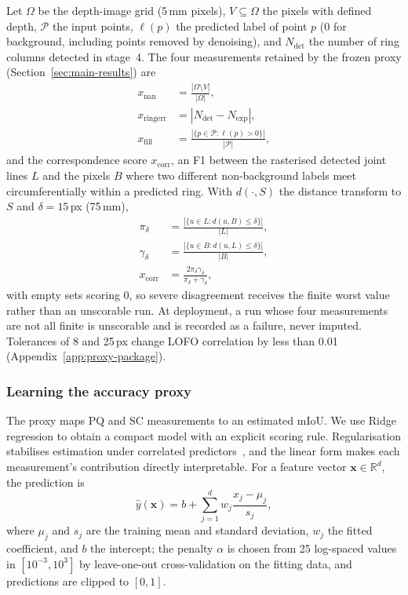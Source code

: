 \documentclass[a4paper,fleqn]{cas-dc}
\begin{document}
Let $\Omega$ be the depth-image grid (5\,mm pixels), $V\subseteq\Omega$ the pixels with defined depth, $\mathcal P$ the input points, $\ell(p)$ the predicted label of point $p$ (0 for background, including points removed by denoising), and $N_{\mathrm{det}}$ the number of ring columns detected in stage~4. The four measurements retained by the frozen proxy (Section~\ref{sec:main-results}) are
\begin{equation}
\begin{aligned}
x_{\mathrm{nan}}&=\frac{|\Omega\setminus V|}{|\Omega|},\\
x_{\mathrm{ringerr}}&=|N_{\mathrm{det}}-N_{\mathrm{exp}}|,\\
x_{\mathrm{fill}}&=\frac{|\{p\in\mathcal P:\ell(p)>0\}|}{|\mathcal P|},
\end{aligned}
\label{eq:feature-defs}
\end{equation}
and the correspondence score $x_{\mathrm{corr}}$, an F1 between the rasterised detected joint lines $L$ and the pixels $B$ where two different non-background labels meet circumferentially within a predicted ring. With $d(\cdot,S)$ the distance transform to $S$ and $\delta=15$\,px (75\,mm),
\begin{equation}
\begin{aligned}
\pi_\delta&=\frac{|\{u\in L: d(u,B)\le\delta\}|}{|L|},\\
\gamma_\delta&=\frac{|\{u\in B: d(u,L)\le\delta\}|}{|B|},\\
x_{\mathrm{corr}}&=\frac{2\pi_\delta\gamma_\delta}{\pi_\delta+\gamma_\delta},
\end{aligned}
\label{eq:corr-f1}
\end{equation}
with empty sets scoring 0, so severe disagreement receives the finite worst value rather than an unscorable run. At deployment, a run whose four measurements are not all finite is unscorable and is recorded as a failure, never imputed. Tolerances of 8 and 25\,px change LOFO correlation by less than 0.01 (Appendix~\ref{app:proxy-package}).

\subsubsection{Learning the accuracy proxy}
\label{sec:ridge-proxy}

The proxy maps PQ and SC measurements to an estimated mIoU. We use Ridge regression to obtain a compact model with an explicit scoring rule. Regularisation stabilises estimation under correlated predictors~\cite{hoerl1970ridge,pedregosa2011sklearn}, and the linear form makes each measurement's contribution directly interpretable. For a feature vector $\mathbf{x}\in\mathbb{R}^{d}$, the prediction is
\begin{equation}
\hat{y}(\mathbf{x})
=
b+\sum_{j=1}^{d}
w_j\frac{x_j-\mu_j}{s_j},
\label{eq:ridge-proxy}
\end{equation}
where $\mu_j$ and $s_j$ are the training mean and standard deviation, $w_j$ the fitted coefficient, and $b$ the intercept; the penalty $\alpha$ is chosen from 25 log-spaced values in $[10^{-3},10^{3}]$ by leave-one-out cross-validation on the fitting data, and predictions are clipped to $[0,1]$.
\end{document}
